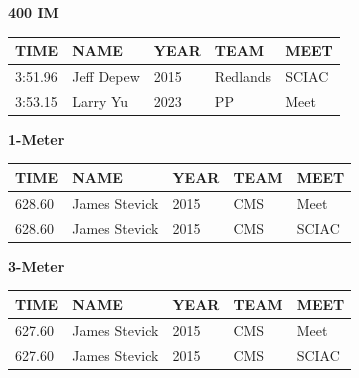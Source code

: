 \begin{table}[H]
\centering
\begin{minipage}[t]{0.6\textwidth}
\centering
\textbf{400 IM}\\[0.1cm]
\begin{tabular}{@{}p{1.8cm}p{2.8cm}p{1.2cm}p{1.4cm}p{1.4cm}@{}}
\hline
    \textbf{TIME} & \textbf{NAME} & \textbf{YEAR} & \textbf{TEAM} & \textbf{MEET} \\
\hline
    3:51.96 & Jeff Depew & 2015 & Redlands & SCIAC \\
    3:53.15 & Larry Yu & 2023 & PP & Meet \\
\hline
\end{tabular}
\end{minipage}
\end{table}

\begin{table}[H]
\centering
\begin{minipage}[t]{0.6\textwidth}
\centering
\textbf{1-Meter}\\[0.1cm]
\begin{tabular}{@{}p{1.8cm}p{2.8cm}p{1.2cm}p{1.4cm}p{1.4cm}@{}}
\hline
    \textbf{TIME} & \textbf{NAME} & \textbf{YEAR} & \textbf{TEAM} & \textbf{MEET} \\
\hline
    628.60 & James Stevick & 2015 & CMS & Meet \\
    628.60 & James Stevick & 2015 & CMS & SCIAC \\
\hline
\end{tabular}
\end{minipage}
\end{table}

\begin{table}[H]
\centering
\begin{minipage}[t]{0.6\textwidth}
\centering
\textbf{3-Meter}\\[0.1cm]
\begin{tabular}{@{}p{1.8cm}p{2.8cm}p{1.2cm}p{1.4cm}p{1.4cm}@{}}
\hline
    \textbf{TIME} & \textbf{NAME} & \textbf{YEAR} & \textbf{TEAM} & \textbf{MEET} \\
\hline
    627.60 & James Stevick & 2015 & CMS & Meet \\
    627.60 & James Stevick & 2015 & CMS & SCIAC \\
\hline
\end{tabular}
\end{minipage}
\end{table}


